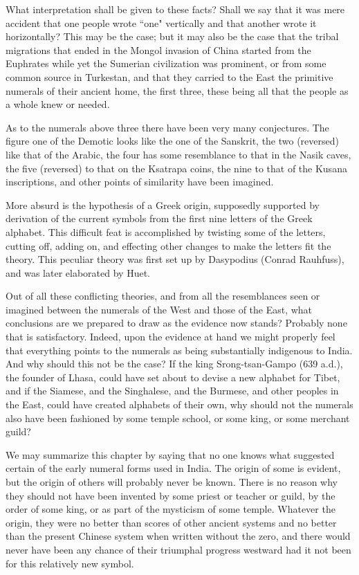 \documentclass[11pt,a4paper]{article}
\begin{document}
What interpretation shall be given to these facts? Shall we say that it was mere accident that one people wrote ``one" vertically and that another wrote it horizontally? This may be the case; but it may also be the case that the tribal migrations that ended in the Mongol invasion of China started from the Euphrates while yet the Sumerian civilization was prominent, or from some common source in Turkestan, and that they carried to the East the primitive numerals of their ancient home, the first three, these being all that the people as a whole knew or needed.

As to the numerals above three there have been very many conjectures. The figure one of the Demotic looks like the one of the Sanskrit, the two (reversed) like that of the Arabic, the four has some resemblance to that in the Nasik caves, the five (reversed) to that on the Ksatrapa coins, the nine to that of the Kusana inscriptions, and other points of similarity have been imagined.

More absurd is the hypothesis of a Greek origin, supposedly supported by derivation of the current symbols from the first nine letters of the Greek alphabet. This difficult feat is accomplished by twisting some of the letters, cutting off, adding on, and effecting other changes to make the letters fit the theory. This peculiar theory was first set up by Dasypodius (Conrad Rauhfuss), and was later elaborated by Huet.

Out of all these conflicting theories, and from all the resemblances seen or imagined between the numerals of the West and those of the East, what conclusions are we prepared to draw as the evidence now stands? Probably none that is satisfactory. Indeed, upon the evidence at hand we might properly feel that everything points to the numerals as being substantially indigenous to India. And why should this not be the case? If the king Srong-tsan-Gampo (639 a.d.), the founder of Lhasa, could have set about to devise a new alphabet for Tibet, and if the Siamese, and the Singhalese, and the Burmese, and other peoples in the East, could have created alphabets of their own, why should not the numerals also have been fashioned by some temple school, or some king, or some merchant guild?

We may summarize this chapter by saying that no one knows what suggested certain of the early numeral forms used in India. The origin of some is evident, but the origin of others will probably never be known. There is no reason why they should not have been invented by some priest or teacher or guild, by the order of some king, or as part of the mysticism of some temple. Whatever the origin, they were no better than scores of other ancient systems and no better than the present Chinese system when written without the zero, and there would never have been any chance of their triumphal progress westward had it not been for this relatively new symbol.
\end{document}
